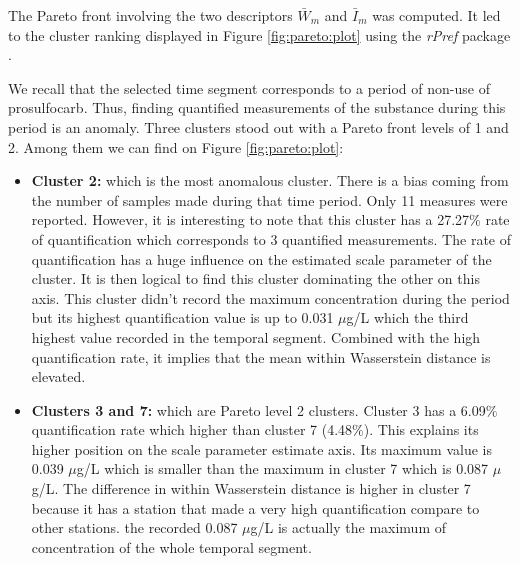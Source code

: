 The Pareto front involving the two descriptors $\bar{W}_m$ and $\bar{I}_m$ was computed. It led to the cluster ranking displayed in Figure \ref{fig:pareto:plot} using the \emph{rPref} package \cite{RJ-2016-054}. 

We recall that the selected time segment corresponds to a period of non-use of prosulfocarb. Thus, finding quantified measurements of the substance during this period is an anomaly. Three clusters stood out with a Pareto front levels of 1 and 2. Among them we can find on Figure \ref{fig:pareto:plot}: 
\begin{itemize}
    \item \textbf{Cluster 2:} which is the most anomalous cluster. There is a bias coming from the number of samples made during that time period. Only 11 measures were reported. However, it is interesting to note that this cluster has a 27.27$\%$ rate of quantification which corresponds to 3 quantified measurements. The rate of quantification has a huge influence on the estimated scale parameter of the cluster. It is then logical to find this cluster dominating the other on this axis. This cluster didn't record the maximum concentration during the period but its highest quantification value is up to 0.031 $\mu$g/L which the third highest value recorded in the temporal segment. Combined with the high quantification rate, it implies that the mean within Wasserstein distance is elevated.  
    \item \textbf{Clusters 3 and 7:} which are Pareto level 2 clusters. Cluster 3 has a 6.09$\%$ quantification rate which higher than cluster 7 (4.48$\%$). This explains its higher position on the scale parameter estimate axis. Its maximum value is 0.039 $\mu$g/L which is smaller than the maximum in cluster 7 which is 0.087 $\mu$g/L. The difference in within Wasserstein distance is higher in cluster 7 because it has a station that made a very high quantification compare to other stations. the recorded 0.087 $\mu$g/L is actually the maximum of concentration of the whole temporal segment.

\end{itemize}
